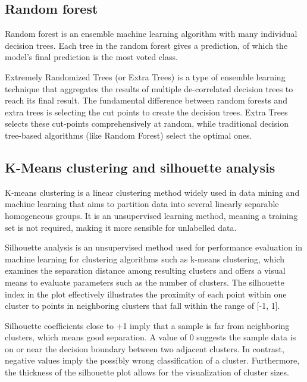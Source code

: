 \subsection{Random forest}

Random forest \cite{598994} is an ensemble machine learning algorithm with many individual decision trees. Each tree in the random forest gives a prediction, of which the model's final prediction is the most voted class.

Extremely Randomized Trees (or Extra Trees) \cite{geurts2006extremely} is a type of ensemble learning technique that aggregates the results of multiple de-correlated decision trees to reach its final result. The fundamental difference between random forests and extra trees is selecting the cut points to create the decision trees. Extra Trees selects these cut-points comprehensively at random, while traditional decision tree-based algorithms (like Random Forest) select the optimal ones.

\subsection{K-Means clustering and silhouette analysis}

K-means clustering \cite{Wu2012} is a linear clustering method widely used in data mining and machine learning that aims to partition data into several linearly separable homogeneous groups. It is an unsupervised learning method, meaning a training set is not required, making it more sensible for unlabelled data.

Silhouette analysis \cite{10.1007/978-3-319-62416-7_21} is an unsupervised method used for performance evaluation in machine learning for clustering algorithms such as k-means clustering, which examines the separation distance among resulting clusters and offers a visual means to evaluate parameters such as the number of clusters. The silhouette index in the plot effectively illustrates the proximity of each point within one cluster to points in neighboring clusters that fall within the range of [-1, 1].

Silhouette coefficients close to +1 imply that a sample is far from neighboring clusters, which means good separation. A value of 0 suggests the sample data is on or near the decision boundary between two adjacent clusters. In contrast, negative values imply the possibly wrong classification of a cluster. Furthermore, the thickness of the silhouette plot allows for the visualization of cluster sizes.

